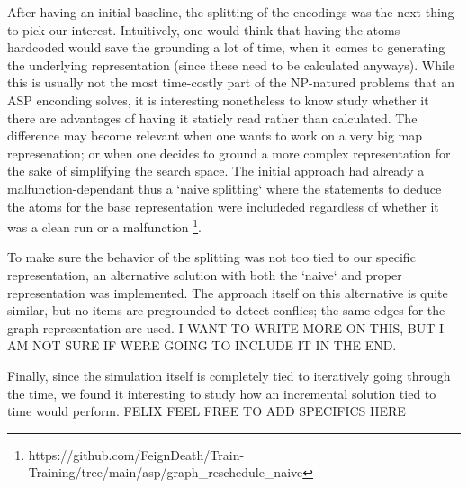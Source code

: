 After having an initial baseline, the splitting of the encodings was the next thing to pick our interest. Intuitively, one would think that having the atoms hardcoded would save the grounding a lot of time, when it comes to generating the underlying representation (since these need to be calculated anyways). While this is usually not the most time-costly part of the NP-natured problems that an ASP enconding solves, it is interesting nonetheless to know study whether it there are advantages of having it staticly read rather than calculated. The difference may become relevant when one wants to work on a very big map represenation; or when one decides to ground a more complex representation for the sake of simplifying the search space.  The initial approach had already a malfunction-dependant thus a `naive splitting` where the statements to deduce the atoms for the base representation were includeded regardless of whether it was a clean run or a malfunction \footnote{https://github.com/FeignDeath/Train-Training/tree/main/asp/graph\_reschedule\_naive}. 

To make sure the behavior of the splitting was not too tied to our specific representation, an alternative solution with both the `naive` and proper representation was implemented. The approach itself on this alternative is quite similar, but no items are pregrounded to detect conflics; the same edges for the graph representation are used. I WANT TO WRITE MORE ON THIS, BUT I AM NOT SURE IF WERE GOING TO INCLUDE IT IN THE END.



Finally, since the simulation itself is completely tied to iteratively going through the time, we found it interesting to study how an incremental solution tied to time would perform. FELIX FEEL FREE TO ADD SPECIFICS HERE



